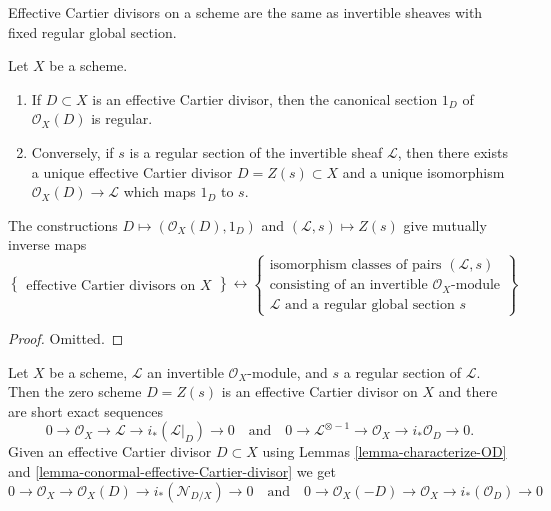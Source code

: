\begin{lemma}
\label{lemma-characterize-OD}
\begin{slogan}
Effective Cartier divisors on a scheme are the same as invertible sheaves
with fixed regular global section.
\end{slogan}
Let $X$ be a scheme.
\begin{enumerate}
\item If $D \subset X$ is an effective Cartier divisor, then
the canonical section $1_D$ of $\mathcal{O}_X(D)$ is regular.
\item Conversely, if $s$ is a regular section of the invertible
sheaf $\mathcal{L}$, then there exists a unique effective
Cartier divisor $D = Z(s) \subset X$ and a unique isomorphism
$\mathcal{O}_X(D) \to \mathcal{L}$ which maps $1_D$ to $s$.
\end{enumerate}
The constructions
$D \mapsto (\mathcal{O}_X(D), 1_D)$ and $(\mathcal{L}, s) \mapsto Z(s)$
give mutually inverse maps
$$
\left\{
\begin{matrix}
\text{effective Cartier divisors on }X
\end{matrix}
\right\}
\leftrightarrow
\left\{
\begin{matrix}
\text{isomorphism classes of pairs }(\mathcal{L}, s)\\
\text{consisting of an invertible }
\mathcal{O}_X\text{-module}\\
\mathcal{L}\text{ and a regular global section }s
\end{matrix}
\right\}
$$
\end{lemma}

\begin{proof}
Omitted.
\end{proof}

\begin{remark}
\label{remark-ses-regular-section}
Let $X$ be a scheme, $\mathcal{L}$ an invertible $\mathcal{O}_X$-module,
and $s$ a regular section of $\mathcal{L}$. Then the zero scheme
$D = Z(s)$ is an effective Cartier divisor on $X$ and there are
short exact sequences
$$
0 \to \mathcal{O}_X \to \mathcal{L} \to i_*(\mathcal{L}|_D) \to 0
\quad\text{and}\quad
0 \to \mathcal{L}^{\otimes -1} \to \mathcal{O}_X \to i_*\mathcal{O}_D \to 0.
$$
Given an effective Cartier divisor $D \subset X$ using
Lemmas \ref{lemma-characterize-OD} and
\ref{lemma-conormal-effective-Cartier-divisor}
we get
$$
0 \to \mathcal{O}_X \to \mathcal{O}_X(D) \to i_*(\mathcal{N}_{D/X}) \to 0
\quad\text{and}\quad
0 \to \mathcal{O}_X(-D) \to \mathcal{O}_X \to i_*(\mathcal{O}_D) \to 0
$$
\end{remark}






